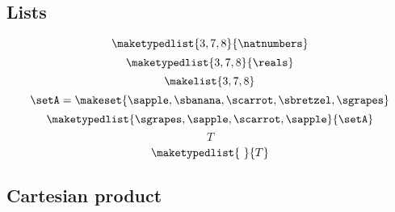 {\begin{forslides}
        \subsection{Lists}

        \begin{equation}
            \label{eq:slides_session2_41}
            \maketypedlist{3, 7, 8}{\natnumbers}
        \end{equation}
        \begin{equation}
            \label{eq:slides_session2_42}
            \maketypedlist{3, 7, 8}{\reals}
        \end{equation}
        \begin{equation}
            \label{eq:slides_session2_43}
            \makelist{3, 7, 8}
        \end{equation}
        \begin{equation}
            \label{eq:slides_session2_44}
            \setA = \makeset{\sapple, \sbanana, \scarrot, \sbretzel, \sgrapes}
        \end{equation}
        \begin{equation}
            \label{eq:slides_session2_45}
            \maketypedlist{\sgrapes, \sapple, \scarrot, \sapple}{\setA}
        \end{equation}
        \begin{equation}
            \label{eq:slides_session2_46}
            T
        \end{equation}
        \begin{equation}
            \label{eq:slides_session2_47}
            \maketypedlist{\ }{T}
        \end{equation}

        \subsection{Cartesian product}


\end{forslides}}
